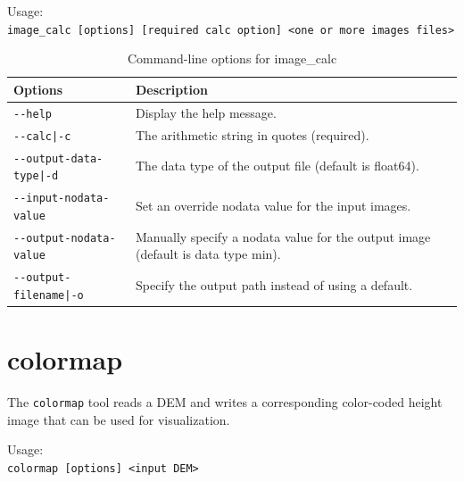 \medskip

Usage:\\
\hspace*{2em}\texttt{image\_calc [options] [required calc option] <one or more images files>}

\medskip

\begin{longtable}{|l|p{10cm}|}
\caption{Command-line options for image\_calc}
\label{tbl:imagecalc}
\endfirsthead
\endhead
\endfoot
\endlastfoot
\hline
Options & Description \\ \hline \hline
\texttt{-\/-help} & Display the help message.\\ \hline
\texttt{-\/-calc|-c} & The arithmetic string in quotes (required).\\ \hline
\texttt{-\/-output-data-type|-d} & The data type of the output file (default is float64).\\ \hline
\texttt{-\/-input-nodata-value} & Set an override nodata value for the input images.\\ \hline
\texttt{-\/-output-nodata-value} & Manually specify a nodata value for the output image (default is data type min).\\ \hline
\texttt{-\/-output-filename|-o} & Specify the output path instead of using a default.\\ \hline
\end{longtable}


\section{colormap}
\label{sec:colormap}

The \verb#colormap# tool reads a DEM and writes a corresponding color-coded height image that can be used for visualization.


\medskip

Usage:\\
\hspace*{2em}\texttt{colormap [options] <input DEM>}

\medskip



